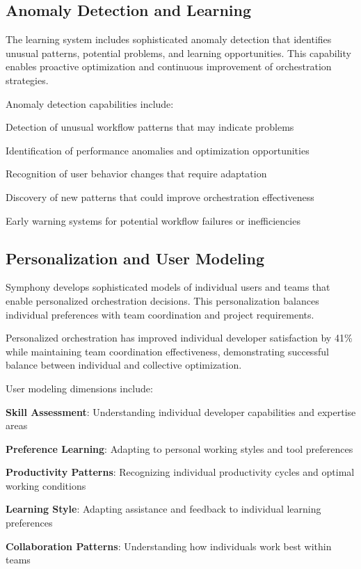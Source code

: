 \subsection*{Anomaly Detection and Learning}

The learning system includes sophisticated anomaly detection that identifies unusual patterns, potential problems, and learning opportunities. This capability enables proactive optimization and continuous improvement of orchestration strategies.

Anomaly detection capabilities include:

\begin{compactlist}
    \item Detection of unusual workflow patterns that may indicate problems
    \item Identification of performance anomalies and optimization opportunities
    \item Recognition of user behavior changes that require adaptation
    \item Discovery of new patterns that could improve orchestration effectiveness
    \item Early warning systems for potential workflow failures or inefficiencies
\end{compactlist}

\subsection*{Personalization and User Modeling}

Symphony develops sophisticated models of individual users and teams that enable personalized orchestration decisions. This personalization balances individual preferences with team coordination and project requirements.

\begin{successbox}
Personalized orchestration has improved individual developer satisfaction by 41\% while maintaining team coordination effectiveness, demonstrating successful balance between individual and collective optimization.
\end{successbox}

User modeling dimensions include:

\begin{expandedlist}
    \item \textbf{Skill Assessment}: Understanding individual developer capabilities and expertise areas
    \item \textbf{Preference Learning}: Adapting to personal working styles and tool preferences
    \item \textbf{Productivity Patterns}: Recognizing individual productivity cycles and optimal working conditions
    \item \textbf{Learning Style}: Adapting assistance and feedback to individual learning preferences
    \item \textbf{Collaboration Patterns}: Understanding how individuals work best within teams
\end{expandedlist}

